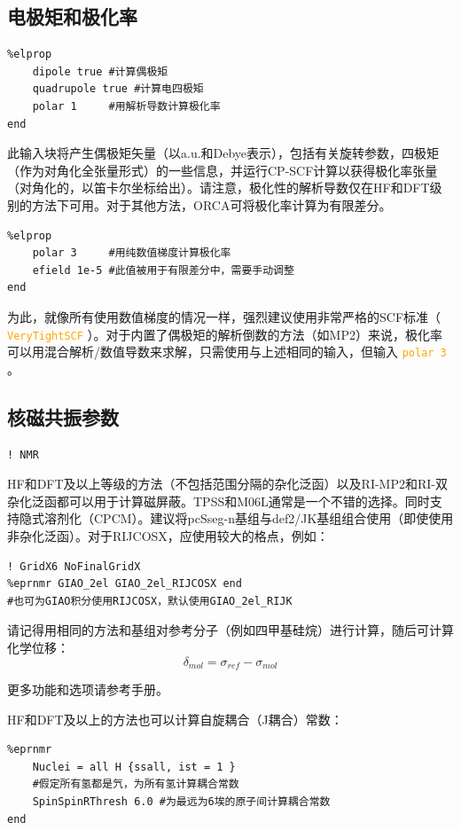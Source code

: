 \documentclass{ctexart}
\newcommand{\cmd}[1]{ \textcolor{orange}{\texttt{#1}} }
\begin{document}
	\subsection{电极矩和极化率} 
	
	\begin{lstlisting}
%elprop 
	dipole true	#计算偶极矩
	quadrupole true	#计算电四极矩
	polar 1		#用解析导数计算极化率
end
	\end{lstlisting}
	
	此输入块将产生偶极矩矢量（以a.u.和Debye表示），包括有关旋转参数，四极矩（作为对角化全张量形式）的一些信息，并运行CP-SCF计算以获得极化率张量（对角化的，以笛卡尔坐标给出）。请注意，极化性的解析导数仅在HF和DFT级别的方法下可用。对于其他方法，ORCA可将极化率计算为有限差分。
	
	\begin{lstlisting}
%elprop 
	polar 3 	#用纯数值梯度计算极化率
	efield 1e-5	#此值被用于有限差分中，需要手动调整
end
	\end{lstlisting}
	
	为此，就像所有使用数值梯度的情况一样，强烈建议使用非常严格的SCF标准（\cmd{VeryTightSCF}）。对于内置了偶极矩的解析倒数的方法（如MP2）来说，极化率可以用混合解析/数值导数来求解，只需使用与上述相同的输入，但输入\cmd{polar 3}。
	
	\subsection{核磁共振参数} 
	\begin{lstlisting}
! NMR
	\end{lstlisting}
	HF和DFT及以上等级的方法（不包括范围分隔的杂化泛函）以及RI-MP2和RI-双杂化泛函都可以用于计算磁屏蔽。TPSS和M06L通常是一个不错的选择。同时支持隐式溶剂化（CPCM）。建议将pcSseg-n基组与def2/JK基组组合使用（即使使用非杂化泛函）。对于RIJCOSX，应使用较大的格点，例如：
	\begin{lstlisting}
! GridX6 NoFinalGridX
%eprnmr GIAO_2el GIAO_2el_RIJCOSX end 
#也可为GIAO积分使用RIJCOSX，默认使用GIAO_2el_RIJK
	\end{lstlisting}
	请记得用相同的方法和基组对参考分子（例如四甲基硅烷）进行计算，随后可计算化学位移：\[\delta_{mol}=\sigma_{ref}-\sigma_{mol}\]
	
	更多功能和选项请参考手册。
	
	HF和DFT及以上的方法也可以计算自旋耦合（J耦合）常数：
	\begin{lstlisting}
%eprnmr 
	Nuclei = all H {ssall, ist = 1 } 
	#假定所有氢都是氕，为所有氢计算耦合常数
	SpinSpinRThresh 6.0	#为最远为6埃的原子间计算耦合常数
end
	\end{lstlisting}
	
\end{document}
